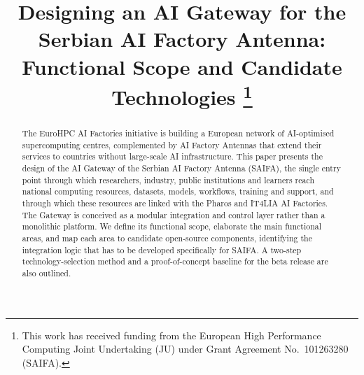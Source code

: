 \documentclass[conference,a4paper]{IEEEtran}
\begin{document}
\title{Designing an AI Gateway for the Serbian AI Factory Antenna: Functional Scope and Candidate Technologies%
\thanks{This work has received funding from the European High Performance Computing Joint Undertaking (JU) under Grant Agreement No.~101263280 (SAIFA).}}

\author{
\and
{}
\and
{}
}

\maketitle

\begin{abstract}
The EuroHPC AI Factories initiative is building a European network of AI-optimised supercomputing centres, complemented by AI Factory Antennas that extend their services to countries without large-scale AI infrastructure. This paper presents the design of the AI Gateway of the Serbian AI Factory Antenna (SAIFA), the single entry point through which researchers, industry, public institutions and learners reach national computing resources, datasets, models, workflows, training and support, and through which these resources are linked with the Pharos and IT4LIA AI Factories. The Gateway is conceived as a modular integration and control layer rather than a monolithic platform. We define its functional scope, elaborate the main functional areas, and map each area to candidate open-source components, identifying the integration logic that has to be developed specifically for SAIFA. A two-step technology-selection method and a proof-of-concept baseline for the beta release are also outlined.
\end{abstract}
\end{document}

